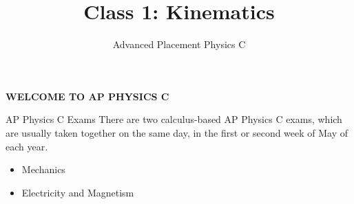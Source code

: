 \documentclass[12pt,compress,aspectratio=169,dvipsnames]{beamer}
\title{Class 1: Kinematics}
\subtitle{Advanced Placement Physics C}
\begin{document}
\begin{frame}{}
  
  {\Large
    \begin{center}
      \textbf{WELCOME TO AP PHYSICS C}
    \end{center}
  }
\end{frame}






\begin{frame}{AP Physics C Exams}
  There are two calculus-based AP Physics C exams, which are usually taken
  together on the same day, in the first or second week of May of each year.
  \begin{itemize}
  \item Mechanics
  \item Electricity and Magnetism
  \end{itemize}
\end{frame}



\begin{frame}
  \titlepage
\end{frame}
\end{document}
